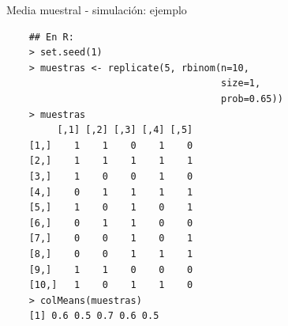 \documentclass{beamer}
\theoremstyle{definition}
\begin{document}
\begin{frame}[fragile]{\color{rosee}Media muestral - simulación: ejemplo} \small
  \begin{lstlisting}
    ## En R:
    > set.seed(1)
    > muestras <- replicate(5, rbinom(n=10, 
                                      size=1, 
                                      prob=0.65))
    > muestras
         [,1] [,2] [,3] [,4] [,5]
    [1,]    1    1    0    1    0
    [2,]    1    1    1    1    1
    [3,]    1    0    0    1    0
    [4,]    0    1    1    1    1
    [5,]    1    0    1    0    1
    [6,]    0    1    1    0    0
    [7,]    0    0    1    0    1
    [8,]    0    0    1    1    1
    [9,]    1    1    0    0    0
    [10,]   1    0    1    1    0
    > colMeans(muestras)
    [1] 0.6 0.5 0.7 0.6 0.5
  \end{lstlisting}
\end{frame}
\end{document}
